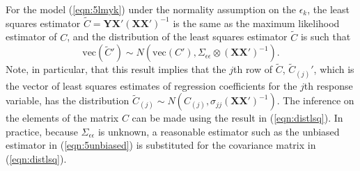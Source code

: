 \begin{result}\label{res:1}
For the model (\ref{eqn:5lmyk}) under the normality assumption on the $\epsilon_k$, the least squares estimator $\tilde{C}=\mathbf{Y} \mathbf{X}'(\mathbf{X} \mathbf{X}')^{-1}$ is the same as the maximum likelihood estimator of $C$, and the distribution of the least squares estimator $\tilde{C}$ is such that 
	\begin{equation}\label{eqn:distlsq}
	\text{vec}(\tilde{C}') \sim N(\text{vec}(C'), \Sigma_{\epsilon\epsilon} \otimes (\mathbf{X} \mathbf{X}')^{-1}).
	\end{equation}
Note, in particular, that this result implies that the $j$th row of $\tilde{C}$, $\tilde{C}_{(j)}'$, which is the vector of least squares estimates of regression coefficients for the $j$th response variable, has the distribution $\tilde{C}_{(j)} \sim N(C_{(j)}, \sigma_{jj}(\mathbf{X}\mathbf{X}')^{-1})$. The inference on the elements of the matrix $C$ can be made using the result in (\ref{eqn:distlsq}). In practice, because $\Sigma_{\epsilon\epsilon}$ is unknown, a reasonable estimator such as the unbiased estimator in (\ref{eqn:5unbiased}) is substituted for the covariance matrix in (\ref{eqn:distlsq}).



\end{result}
